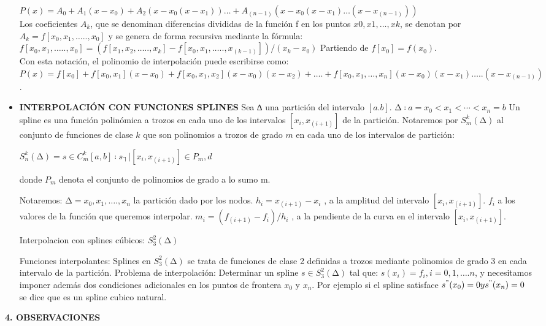 \documentclass[10pt,a4paper]{article}
\begin{document}
\begin{multicols}{2}
\begin{itemize}
	$P(x)=A_0+A_1 (x-x_0 )+A_2 (x-x_0 (x-x_1 ))…+A_(n-1) (x-x_0 (x-x_1 )…(x-x_(n-1) )) $\\
	Los coeficientes  $A_k$, que se denominan diferencias divididas de la función f en los puntos $x0,x1,…, xk$, se denotan por $A_k=f [x_0,x_1,…..,x_0]$ y se genera de forma recursiva mediante la fórmula: \\
	$f [x_0,x_1,…..,x_0 ]=(f [x_1,x_2,…..,x_k ]-f [x_0,x_1,…..,x_(k-1)]  )/(x_k-x_0 )$
	Partiendo de $f [x_0]=f (x_0)$.\\
	Con esta notación, el polinomio de interpolación puede escribirse como:\\
	$P(x)= f [x_0 ]+f [x_0,x_1]( x-x_0)+ f [x_0,x_1,x_2]( x-x_0) ( x-x_2)+….+ f [x_0,x_1,…,x_n]( x-x_0) ( x-x_1)….. ( x-x_(n-1))$.
	\item \textbf{INTERPOLACIÓN CON FUNCIONES SPLINES}
	Sea ∆ una partición del intervalo $[a.b]$.
	$∆ ∶ a=x_0<x_1<⋯<x_n=b$
	Un spline es una función polinómica a trozos en cada uno de los intervalos $[x_i,x_(i+1)]$ de la partición.
	Notaremos por $S_m^k (∆)$ al conjunto de funciones de clase $k$ que son polinomios a trozos de grado $m$ en cada uno de los intervalos de partición:
	
	$S_n^k (∆)={ s∈C_m^k  [a,b] ∶ s ┤|[x_i,x_(i+1) ]∈ P_m}, d$
	
	donde $P_m$ denota el conjunto de polinomios de grado a lo sumo m.
	
	Notaremos:
	$∆={x_0,x_1,….,x_n  }$ la partición dado por los nodos.
	$h_i=x_(i+1)-x_i$ , a la amplitud del intervalo $[x_i,x_(i+1)]$.
	$f_i$ a los valores de la función que queremos interpolar.
	$m_i=(f_(i+1)-f_i)/h_i$ , a la pendiente de la curva en el intervalo $[x_i,x_(i+1)]$.
	
	Interpolacion con splines cúbicos: $S_3^2 (∆)$
	
	Funciones interpolantes: Splines en $S_3^2 (∆)$ se trata de funciones de clase 2 definidas a trozos mediante polinomios de grado 3 en cada intervalo de la partición. 
	Problema de interpolación: Determinar un spline $s∈S_3^2 (∆)$ tal que:
	$s (x_i )=f_i, i=0,1,….n$, y necesitamos imponer además dos condiciones adicionales en los puntos de frontera $x_0$ y $x_n$. Por ejemplo si el spline satisface  $s^" (x_0 )=0 y s^" (x_n )=0$ se dice que es un spline cubico natural.

\end{itemize}

\begin{center}
{\large \bf 4. OBSERVACIONES}
\end{center}


\end{multicols}
\end{document}
